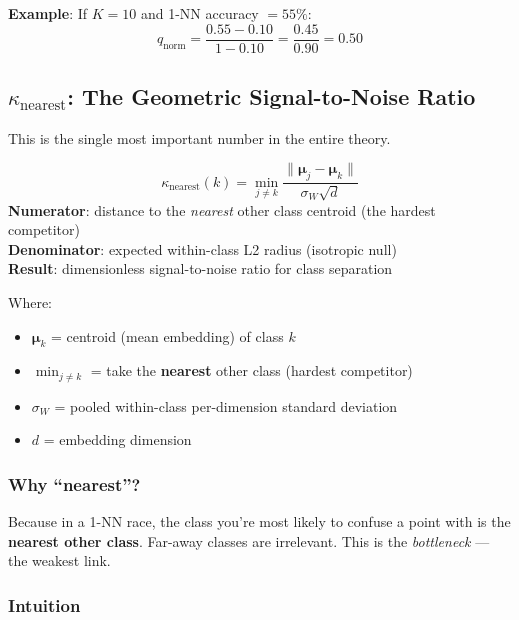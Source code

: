 \documentclass[11pt,a4paper]{article}
\begin{document}
\textbf{Example}: If $K{=}10$ and 1-NN accuracy $= 55\%$:
\[
q_{\mathrm{norm}} = \frac{0.55 - 0.10}{1 - 0.10} = \frac{0.45}{0.90} = 0.50
\]

\subsection{$\kappa_{\mathrm{nearest}}$: The Geometric Signal-to-Noise Ratio}

This is the single most important number in the entire theory.

\begin{keybox}
\vspace{-0.3cm}
\begin{equation}
\kappa_{\mathrm{nearest}}(k) = \min_{j \neq k} \frac{\|\boldsymbol{\mu}_j - \boldsymbol{\mu}_k\|}{\sigma_W \sqrt{d}}
\end{equation}
\textbf{Numerator}: distance to the \emph{nearest} other class centroid (the hardest competitor)\\
\textbf{Denominator}: expected within-class L2 radius (isotropic null)\\
\textbf{Result}: dimensionless signal-to-noise ratio for class separation
\end{keybox}

Where:
\begin{itemize}[nosep]
\item $\boldsymbol{\mu}_k$ = centroid (mean embedding) of class $k$
\item $\min_{j \neq k}$ = take the \textbf{nearest} other class (hardest competitor)
\item $\sigma_W$ = pooled within-class per-dimension standard deviation
\item $d$ = embedding dimension
\end{itemize}

\subsubsection{Why ``nearest''?}

Because in a 1-NN race, the class you're most likely to confuse a point with is the \textbf{nearest other class}. Far-away classes are irrelevant. This is the \emph{bottleneck} --- the weakest link.

\subsubsection{Intuition}
\end{document}
